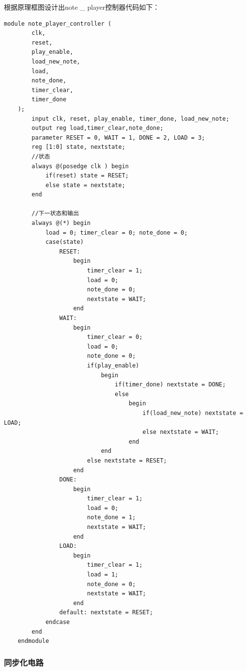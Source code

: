 \documentclass{../source/Experiment}
\begin{document}
                根据原理框图设计出note \_ player控制器代码如下：
                \begin{lstlisting}[name = note _ player控制器代码]
    module note_player_controller (
        clk,
        reset,
        play_enable,
        load_new_note,
        load,
        note_done,
        timer_clear,
        timer_done
    );
        input clk, reset, play_enable, timer_done, load_new_note;
        output reg load,timer_clear,note_done;
        parameter RESET = 0, WAIT = 1, DONE = 2, LOAD = 3;
        reg [1:0] state, nextstate;
        //状态
        always @(posedge clk ) begin
            if(reset) state = RESET;
            else state = nextstate;
        end

        //下一状态和输出
        always @(*) begin
            load = 0; timer_clear = 0; note_done = 0;
            case(state)
                RESET:
                    begin
                        timer_clear = 1;
                        load = 0;
                        note_done = 0;
                        nextstate = WAIT;
                    end
                WAIT:
                    begin
                        timer_clear = 0;
                        load = 0;
                        note_done = 0;
                        if(play_enable)
                            begin
                                if(timer_done) nextstate = DONE;
                                else
                                    begin
                                        if(load_new_note) nextstate = LOAD;
                                        else nextstate = WAIT;
                                    end
                            end
                        else nextstate = RESET;
                    end
                DONE:
                    begin
                        timer_clear = 1;
                        load = 0;
                        note_done = 1;
                        nextstate = WAIT;
                    end
                LOAD:
                    begin
                        timer_clear = 1;
                        load = 1;
                        note_done = 0;
                        nextstate = WAIT;
                    end
                default: nextstate = RESET;
            endcase
        end
    endmodule
                \end{lstlisting}    
            \subsubsection{同步化电路}
\end{document}
